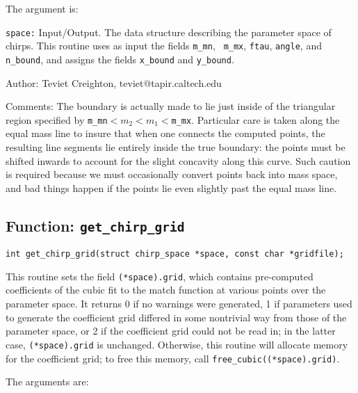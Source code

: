 The argument is:

\begin{description}
\item{\tt space:}
  Input/Output.  The data structure describing the parameter space of
  chirps.  This routine uses as input the fields {\tt m\_mn}, {\tt
  m\_mx}, {\tt ftau}, {\tt angle}, and {\tt n\_bound}, and assigns the
  fields {\tt x\_bound} and {\tt y\_bound}.

\end{description}

\begin{description}
\item{Author:}
  Teviet Creighton, teviet@tapir.caltech.edu
\item{Comments:}
  The boundary is actually made to lie just inside of the triangular
  region specified by {\tt m\_mn}$<m_2<m_1<${\tt m\_mx}.  Particular
  care is taken along the equal mass line to insure that when one
  connects the computed points, the resulting line segments lie
  entirely inside the true boundary: the points must be shifted
  inwards to account for the slight concavity along this curve.  Such
  caution is required because we must occasionally convert points back
  into mass space, and bad things happen if the points lie even
  slightly past the equal mass line.
\end{description}


\clearpage
\subsection{Function: {\tt get\_chirp\_grid}}
\label{ss:get_chirp_grid}

\begin{verbatim}
int get_chirp_grid(struct chirp_space *space, const char *gridfile);
\end{verbatim}
This routine sets the field {\tt (*space).grid}, which contains
pre-computed coefficients of the cubic fit to the match function at
various points over the parameter space.  It returns 0 if no warnings
were generated, 1 if parameters used to generate the coefficient grid
differed in some nontrivial way from those of the parameter space, or
2 if the coefficient grid could not be read in; in the latter case,
{\tt (*space).grid} is unchanged.  Otherwise, this routine will
allocate memory for the coefficient grid; to free this memory, call
{\tt free\_cubic((*space).grid)}.

The arguments are:

